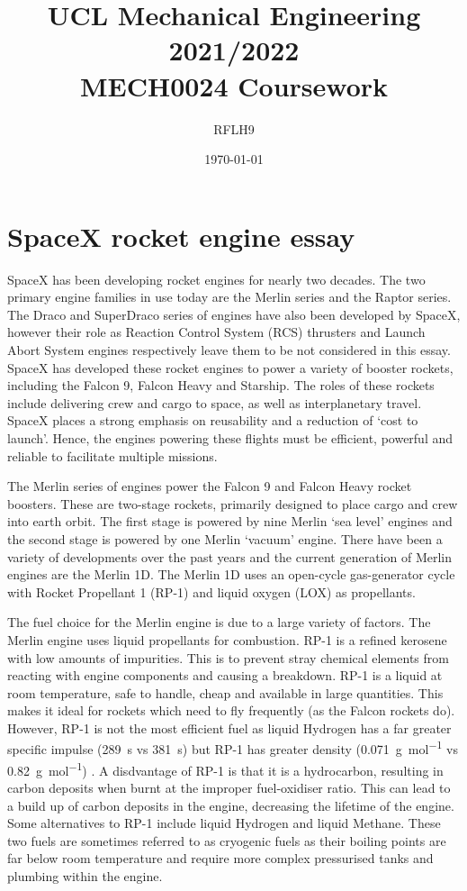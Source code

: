 \documentclass[11pt]{article}
\numberwithin{equation}{section}
\begin{document}
\title{\textbf{UCL Mechanical Engineering 2021/2022}\\MECH0024 Coursework}
\author{RFLH9}
\date{\today}
\maketitle
\tableofcontents
\listoffigures
\newpage
\part{SpaceX rocket engine essay}
SpaceX has been developing rocket engines for nearly two decades. The two primary engine families in use today are the Merlin series and the Raptor series. The Draco and SuperDraco series of engines have also been developed by SpaceX, however their role as Reaction Control System (RCS) thrusters and Launch Abort System engines respectively leave them to be not considered in this essay. SpaceX has developed these rocket engines to power a variety of booster rockets, including the Falcon 9, Falcon Heavy and Starship. The roles of these rockets include delivering crew and cargo to space, as well as interplanetary travel. SpaceX places a strong emphasis on reusability and a reduction of `cost to launch'. Hence, the engines powering these flights must be efficient, powerful and reliable to facilitate multiple missions.

The Merlin series of engines power the Falcon 9 and Falcon Heavy rocket boosters. These are two-stage rockets, primarily designed to place cargo and crew into earth orbit. The first stage is powered by nine Merlin `sea level' engines and the second stage is powered by one Merlin `vacuum' engine. There have been a variety of developments over the past years and the current generation of Merlin engines are the Merlin 1D. The Merlin 1D uses an open-cycle gas-generator cycle with Rocket Propellant 1 (RP-1) and liquid oxygen (LOX) as propellants.

The fuel choice for the Merlin engine is due to a large variety of factors. The Merlin engine uses liquid propellants for combustion. RP-1 is a refined kerosene with low amounts of impurities. This is to prevent stray chemical elements from reacting with engine components and causing a breakdown. RP-1 is a liquid at room temperature, safe to handle, cheap and available in large quantities. This makes it ideal for rockets which need to fly frequently (as the Falcon rockets do). However, RP-1 is not the most efficient fuel as liquid Hydrogen has a far greater specific impulse (\SI{289}{\second} vs \SI{381}{\second}) but RP-1 has greater density (\SI{0.071}{\gram\per\mol} vs \SI{0.82}{\gram\per\mol}) \cite{b1}. A disdvantage of RP-1 is that it is a hydrocarbon, resulting in carbon deposits when burnt at the improper fuel-oxidiser ratio. This can lead to a build up of carbon deposits in the engine, decreasing the lifetime of the engine. Some alternatives to RP-1 include liquid Hydrogen and liquid Methane. These two fuels are sometimes referred to as cryogenic fuels as their boiling points are far below room temperature and require more complex pressurised tanks and plumbing within the engine. 
\end{document}
